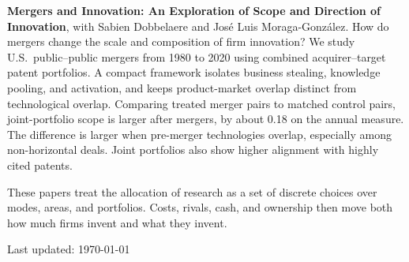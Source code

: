 \documentclass[10pt,letterpaper]{article}
\begin{document}
\textbf{Mergers and Innovation: An Exploration of Scope and Direction of Innovation}, with Sabien Dobbelaere and Jos\'e Luis Moraga-Gonz\'alez.
How do mergers change the scale and composition of firm innovation? We study U.S.\ public--public mergers from 1980 to 2020 using combined acquirer--target patent portfolios. A compact framework isolates business stealing, knowledge pooling, and activation, and keeps product-market overlap distinct from technological overlap. Comparing treated merger pairs to matched control pairs, joint-portfolio scope is larger after mergers, by about 0.18 on the annual measure. The difference is larger when pre-merger technologies overlap, especially among non-horizontal deals. Joint portfolios also show higher alignment with highly cited patents.

These papers treat the allocation of research as a set of discrete choices over modes, areas, and portfolios. Costs, rivals, cash, and ownership then move both how much firms invent and what they invent.

\vspace{0.15in}
\begin{center}
  \begin{footnotesize}
    Last updated: \today
  \end{footnotesize}
\end{center}
\end{document}

